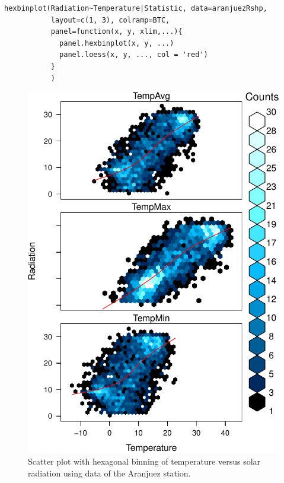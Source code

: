 
\lstset{language=R}
\begin{lstlisting}
hexbinplot(Radiation~Temperature|Statistic, data=aranjuezRshp,
           layout=c(1, 3), colramp=BTC, 
           panel=function(x, y, xlim,...){
             panel.hexbinplot(x, y, ...)
             panel.loess(x, y, ..., col = 'red')
           }
           )
\end{lstlisting}

\begin{figure}[htb]
\centering
\includegraphics[width=.9\linewidth]{figs/aranjuezHexbinplot.pdf}
\caption{\label{fig:aranjuezHexbin}Scatter plot with hexagonal binning of temperature versus solar radiation using data of the Aranjuez station.}
\end{figure}



